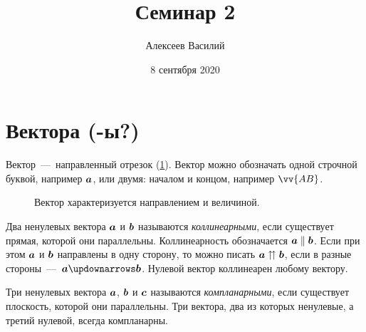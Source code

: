 \documentclass[a4paper,12pt]{article}
\author{Алексеев Василий}
\title{Семинар 2}
\date{8 сентября 2020}
\begin{document}
  \maketitle
  
  \tableofcontents

  \thispagestyle{empty}
  
  \newpage
  


  \section{Вектора (-ы?)}
  
  Вектор~---~направленный отрезок (\ref{fig:vector}).
  Вектор можно обозначать одной строчной буквой, например $\boldsymbol a$, или двумя: началом и концом, например $\vv{AB}$.
  
  \begin{figure}[h]
    \centering
    
    
    \caption{Вектор характеризуется направлением и величиной.}
    \label{fig:vector}
  \end{figure}
  
  \begin{definition}[Коллинеарность]  %
    Два ненулевых вектора $\boldsymbol a$ и $\boldsymbol b$ называются \emph{коллинеарными}, если существует прямая, которой они параллельны.
    Коллинеарность обозначается $\bds a \hm\parallel \bds b$.
    Если при этом $\boldsymbol a$ и $\boldsymbol b$ направлены в одну сторону, то можно писать $\bds a \hm\upuparrows \bds b$,
    если в разные стороны~---~$\bds a \hm\updownarrows \bds b$.
    Нулевой вектор коллинеарен любому вектору.
  \end{definition}
  
  \begin{definition}[Компланарность]  %
    Три ненулевых вектора $\boldsymbol a$, $\boldsymbol b$ и $\boldsymbol c$ называются \emph{компланарными}, если существует плоскость, которой они параллельны.
    Три вектора, два из которых ненулевые, а третий нулевой, всегда компланарны.
  \end{definition}
  
\end{document}
